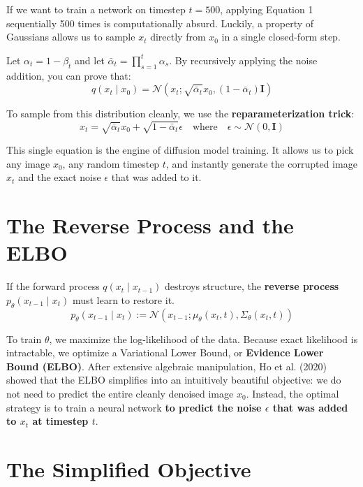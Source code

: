 \documentclass[12pt]{article}
\begin{document}
If we want to train a network on timestep $t=500$, applying Equation 1 sequentially 500 times is computationally absurd. Luckily, a property of Gaussians allows us to sample $x_t$ directly from $x_0$ in a single closed-form step.

Let $\alpha_t = 1 - \beta_t$ and let $\bar{\alpha}_t = \prod_{s=1}^t \alpha_s$. By recursively applying the noise addition, you can prove that:
\begin{equation}
    q(x_t \mid x_0) = \mathcal{N}(x_t; \sqrt{\bar{\alpha}_t} x_0, (1 - \bar{\alpha}_t)\mathbf{I})
\end{equation}

To sample from this distribution cleanly, we use the \textbf{reparameterization trick}:
\begin{equation}
    x_t = \sqrt{\bar{\alpha}_t} x_0 + \sqrt{1 - \bar{\alpha}_t} \epsilon \quad \text{where} \quad \epsilon \sim \mathcal{N}(0, \mathbf{I})
\end{equation}

This single equation is the engine of diffusion model training. It allows us to pick any image $x_0$, any random timestep $t$, and instantly generate the corrupted image $x_t$ and the exact noise $\epsilon$ that was added to it.

\section*{The Reverse Process and the ELBO}

If the forward process $q(x_t \mid x_{t-1})$ destroys structure, the \textbf{reverse process} $p_\theta(x_{t-1} \mid x_t)$ must learn to restore it. 
\begin{equation}
    p_\theta(x_{t-1} \mid x_t) := \mathcal{N}(x_{t-1}; \mu_\theta(x_t, t), \Sigma_\theta(x_t, t))
\end{equation}

To train $\theta$, we maximize the log-likelihood of the data. Because exact likelihood is intractable, we optimize a Variational Lower Bound, or \textbf{Evidence Lower Bound (ELBO)}. After extensive algebraic manipulation, Ho et al. (2020) showed that the ELBO simplifies into an intuitively beautiful objective: we do not need to predict the entire cleanly denoised image $x_0$. Instead, the optimal strategy is to train a neural network \textbf{to predict the noise $\epsilon$ that was added to $x_t$ at timestep $t$}.

\section*{The Simplified Objective}
\end{document}
